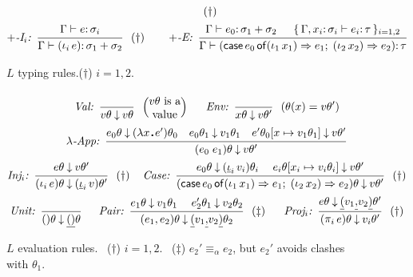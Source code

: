 \documentclass[envcountsame]{llncs}
\newcommand{\key}[1]{\ensuremath{\mathop{\mathsf{#1}}\nolimits}\xspace}
\newcommand{\Case}{\key{case}}
\newcommand{\Of}{\key{of}}
\newcommand{\ustrut}{\rule[-.18\baselineskip]{0pt}{0pt}}
\newcommand{\inj}{\mathop{\iota}\nolimits}
\newcommand{\proj}{\mathop{\pi}\nolimits}
\newcommand{\upair}[2]{\underline{(}#1\underline{\ustrut,}#2\underline{)}}
\newcommand{\uiota}{\mathop{\underline{\iota}}\nolimits}
\newcommand{\set}[1]{\{\,#1\,\}}
\newcommand{\entails}{\vdash}
\newcommand{\sqdot}{\rule{0.5mm}{0.5mm}}
\newcommand{\lam}[1]{\lambda #1\,\sqdot\,}
\newcommand{\yields}{\mathbin{\downarrow}}
\newcommand{\of}{\colon}
\renewcommand{\colon}{\mathpunct{:}}
\newcommand{\Quad}[1]{\hspace*{#1em}}
\newcommand{\irule}[2]{\ensuremath{{\frac{\strut\textstyle #1}{\strut\textstyle #2}}}}
\newcommand{\rulelabel}[1]{\hbox{\it #1:}\Quad{0.5}}
\newcommand{\sidecond}[1]{\Quad{0.5} \left(#1\right)}
\begin{document}
\begin{figure}[t]
\begin{minipage}{\textwidth}
\begin{gather*}
					\sidecond{\dagger}
\\[0ex] \rulelabel{$+$-I$_i$}
    \irule{ 
	            \Gamma\entails e\of\sigma_{i}}{
                \Gamma\entails (\inj_i e)\of\sigma_1+\sigma_2} 
					\sidecond{\dagger}
\Quad{2}
    \rulelabel{$+$-E}
    \irule{
	\Gamma\entails e_0\of \sigma_1+\sigma_2
    \Quad{1.5}             
    \set{\Gamma,x_i\of\sigma_i\entails e_i\of \tau}_{i=1,2}}{\Gamma\entails (\Case e_0 \Of 
        (\inj_1 x_1) \Rightarrow e_1 ;\;
        (\inj_2 x_2) \Rightarrow e_2)\of\tau}
\end{gather*}
\caption{$L$ typing rules.\quad  ($\dagger$) $i=1,2$.}
  \label{fig:core:typing}
\end{minipage}
\begin{minipage}{\textwidth}\small
\begin{gather*}
  \rulelabel{Val}  \irule{}{v\theta \yields v\theta}
  \sidecond{\parbox{1cm}{\centering $v\theta$ is a value}}
  \Quad{1.5}
  \rulelabel{Env} \irule{}{x\theta\yields v\theta'}  
        \sidecond{\theta(x) = v\theta'}
\\
  \rulelabel{$\lambda$-App} \irule{e_0\theta\yields(\lam{x}e')\theta_0 \Quad{1}
         e_0\theta_1\yields v_1\theta_1\Quad{1}
         e'\theta_0[x\mapsto v_1\theta_1]\yields v\theta' 
         }{(e_0\;e_1)\theta\yields v\theta'}
\\
\rulelabel{Inj$_i$} \irule{e\theta\yields v\theta'}{(\inj_i e)\theta\yields (\uiota_i v)\theta'}
					\sidecond{\dagger}
\Quad{1}
  \rulelabel{Case} \irule{e_0\theta\yields (\uiota_i v_i)\theta_i\Quad{1.25} 
         e_i\theta[x_i\mapsto v_i\theta_i]\yields v\theta'}{(\Case e_0  \Of  
        (\inj_1 x_1) \Rightarrow e_1 ;\;
        (\inj_2 x_2) \Rightarrow e_2)\theta\yields
         v\theta'}
					\sidecond{\dagger}
\\
  \rulelabel{Unit} \irule{}{()\theta \yields \underline{()}\theta}
  \Quad{1.5}
  \rulelabel{Pair} \irule{e_1\theta\yields v_1\theta_1 \Quad{1.25}
         e_2'\theta_1\yields v_2\theta_2}{(e_1,e_2)\theta \yields \upair{v_1}{v_2}\theta_2}
         \sidecond{\ddagger}         
  \Quad{1.5}
  \rulelabel{Proj$_i$} \irule{e\theta\yields \upair{v_1}{v_2}\theta'}{(\proj_i e)\theta \yields v_i\theta'}
					\sidecond{\dagger}
\end{gather*}
\caption{$L$ evaluation rules. 
\   ($\dagger$) $i=1,2$.
\  ($\ddagger$) $e_2'\equiv_\alpha e_2$, but $e_2'$ avoids
clashes with $\theta_1$.
}
\label{fig:core:eval}
\end{minipage}
\end{figure}
\end{document}
